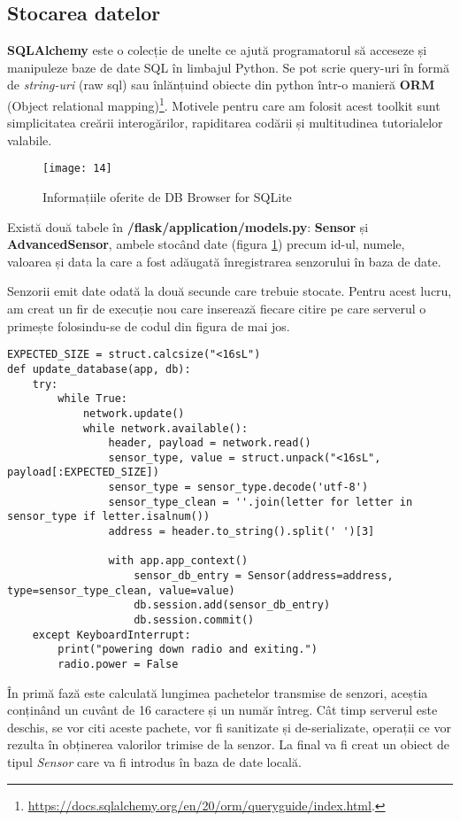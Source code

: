 \subsection{Stocarea datelor}

\textbf{SQLAlchemy} este o colecție de unelte ce ajută programatorul să acceseze și manipuleze baze de date SQL în limbajul Python. Se pot scrie query-uri în formă de \emph{string-uri} (raw sql) sau înlănțuind obiecte din python într-o manieră \textbf{ORM} (Object relational mapping)\footnote{\url{https://docs.sqlalchemy.org/en/20/orm/queryguide/index.html}.}. Motivele pentru care am folosit acest toolkit sunt simplicitatea creării interogărilor, rapiditarea codării și multitudinea tutorialelor valabile.

\begin{figure}[h]
	\centering
	\texttt{[image: 14]}
	\caption{Informațiile oferite de DB Browser for SQLite}
	\label{fig:14}
\end{figure}

Există două tabele în \textbf{/flask/application/models.py}: \textbf{Sensor} și \textbf{AdvancedSensor}, ambele stocând date (figura \ref{fig:14}) precum id-ul, numele, valoarea și data la care a fost adăugată înregistrarea senzorului în baza de date.

\break

Senzorii emit date odată la două secunde care trebuie stocate. Pentru acest lucru, am creat un fir de execuție nou care inserează fiecare citire pe care serverul o primește folosindu-se de codul din figura de mai jos.

\begin{lstlisting}[style=python, label=code:db]
EXPECTED_SIZE = struct.calcsize("<16sL")
def update_database(app, db):
	try:
		while True:
			network.update()
			while network.available():
				header, payload = network.read()
				sensor_type, value = struct.unpack("<16sL", payload[:EXPECTED_SIZE])
				sensor_type = sensor_type.decode('utf-8')
				sensor_type_clean = ''.join(letter for letter in sensor_type if letter.isalnum())
				address = header.to_string().split(' ')[3]
				
				with app.app_context()
					sensor_db_entry = Sensor(address=address, type=sensor_type_clean, value=value)
					db.session.add(sensor_db_entry)
					db.session.commit()
	except KeyboardInterrupt:
		print("powering down radio and exiting.")
		radio.power = False
\end{lstlisting}

În primă fază este calculată lungimea pachetelor transmise de senzori, aceștia conținând un cuvânt de 16 caractere și un număr întreg. Cât timp serverul este deschis, se vor citi aceste pachete, vor fi sanitizate și de-serializate, operații ce vor rezulta în obținerea valorilor trimise de la senzor.
La final va fi creat un obiect de tipul \emph{Sensor} care va fi introdus în baza de date locală.


